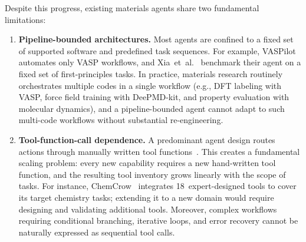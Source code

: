 \documentclass{article}
\begin{document}
Despite this progress, existing materials agents share two fundamental limitations:

\begin{enumerate}
\item \textbf{Pipeline-bounded architectures.}
Most agents are confined to a fixed set of supported software and predefined task sequences.
For example, VASPilot~\citep{Liu2025} automates only VASP workflows, and Xia~et~al.~\citep{Xia2025vasp} benchmark their agent on a fixed set of first-principles tasks.
In practice, materials research routinely orchestrates multiple codes in a single workflow (e.g., DFT labeling with VASP, force field training with DeePMD-kit, and property evaluation with molecular dynamics), and a pipeline-bounded agent cannot adapt to such multi-code workflows without substantial re-engineering.

\item \textbf{Tool-function-call dependence.}
A predominant agent design routes actions through manually written tool functions~\citep{Yao2023,Shinn2023}.
This creates a fundamental scaling problem: every new capability requires a new hand-written tool function, and the resulting tool inventory grows linearly with the scope of tasks.
For instance, ChemCrow~\citep{Bran2024} integrates 18~expert-designed tools to cover its target chemistry tasks; extending it to a new domain would require designing and validating additional tools.
Moreover, complex workflows requiring conditional branching, iterative loops, and error recovery cannot be naturally expressed as sequential tool calls.
\end{enumerate}
\end{document}
